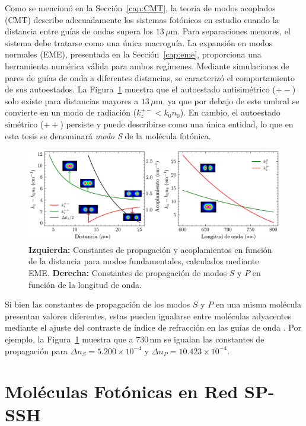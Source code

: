 Como se mencionó en la Sección~\ref{cap:CMT}, la teoría de modos acoplados (CMT) describe adecuadamente los sistemas fotónicos en estudio cuando la distancia entre guías de ondas supera los $13\,\mu$m. Para separaciones menores, el sistema debe tratarse como una única macroguía. La expansión en modos normales (EME), presentada en la Sección~\ref{cap:eme}, proporciona una herramienta numérica válida para ambos regímenes. Mediante simulaciones de pares de guías de onda a diferentes distancias, se caracterizó el comportamiento de sus autoestados. La Figura~\ref{fig:molecule-coup} muestra que el autoestado antisimétrico ($+-$) solo existe para distancias mayores a $13\,\mu$m, ya que por debajo de este umbral se convierte en un modo de radiación ($k_z^{+-} < k_0 n_0$). En cambio, el autoestado simétrico ($++$) persiste y puede describirse como una única entidad, lo que en esta tesis se denominará \textit{modo S} de la molécula fotónica.
\begin{figure}[H]
	\centering
	\includegraphics[width=0.9\linewidth]{media/eigenvalues_vs_angle.png}
	\caption[Propagación y acoplamientos en moléculas fotónicas]{
		\textbf{Izquierda:} Constantes de propagación y acoplamientos en función de la distancia para modos fundamentales, calculados mediante EME. 
		\textbf{Derecha:} Constantes de propagación de modos $S$ y $P$ en función de la longitud de onda.
		\label{fig:molecule-coup}}
\end{figure}
Si bien las constantes de propagación de los modos $S$ y $P$ en una misma molécula presentan valores diferentes, estas pueden igualarse entre moléculas adyacentes mediante el ajuste del contraste de índice de refracción en las guías de onda \citep{interorbital, SPSSH}. Por ejemplo, la Figura~\ref{fig:molecule-coup} muestra que a $730$\,nm se igualan las constantes de propagación para $\Delta n_S = 5.200 \times 10^{-4}$ y $\Delta n_P = 10.423 \times 10^{-4}$.

\section{Moléculas Fotónicas en Red SP-SSH}

